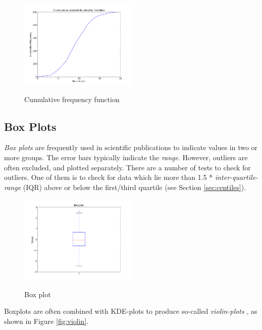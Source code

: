 \begin{figure}[ht]
  \centering
  \includegraphics[width=0.5\textwidth]{../Images/CumulativeFrequencyFunction.png}\\
  \caption{Cumulative frequency function}
\end{figure}

\subsection{Box Plots}

\emph{Box plots} are frequently used in scientific publications to indicate values in two or more groups. The error bars typically indicate the \emph{range}. However, outliers are often excluded, and plotted separately. There are a number of tests to check for outliers. One of them is to check for data which lie more than 1.5 * \emph{inter-quartile-range} (IQR) above or below the first/third quartile (see Section \ref{sec:centiles}).

\begin{figure}[!ht]
  \centering
  \includegraphics[width=0.5\textwidth]{../Images/boxplot.png}\\
  \caption{Box plot}\label{fig:Boxplot}
\end{figure}

Boxplots are often combined with KDE-plots to produce so-called \emph{violin-plots} , as shown in Figure \ref{fig:violin}.

